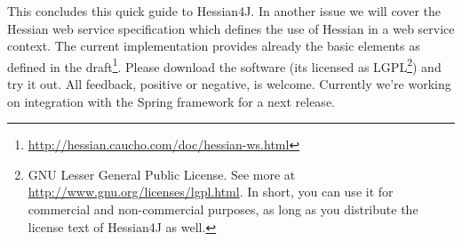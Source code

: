 \documentclass[a4paper]{article}
\begin{document}
This concludes this quick guide to Hessian4J. In another issue we will cover the Hessian web service specification which defines the use of Hessian in a web service context.  The current implementation provides already the basic elements as defined in the draft\footnote{\url{http://hessian.caucho.com/doc/hessian-ws.html}}. Please download the software (its licensed as LGPL\footnote{GNU Lesser General Public License. See more at \url{http://www.gnu.org/licenses/lgpl.html}. In short, you can use it for commercial and non-commercial purposes, as long as you distribute the license text of Hessian4J as well.}) and try it out. All feedback, positive or negative, is welcome.  Currently we're working on integration with the Spring framework for a next release.
\end{document}
